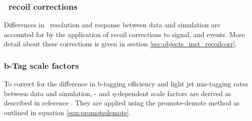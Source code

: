\subsubsection*{\MET~recoil corrections}
Differences in \MET~resolution and response between data and simulation
are accounted for by the application of recoil corrections
to signal, \Wjets and \Ztautau events. More detail
about these corrections is given in section \ref{sec:objects_met_recoilcorr}.
\subsubsection*{b-Tag scale factors}
To correct for the difference in b-tagging efficiency
and light jet mis-tagging rates between data and simulation,
\pT- and $\eta$-dependent scale factors are derived as 
described in reference \cite{cms-btag-run2}. They 
are applied using the promote-demote method
as outlined in equation \ref{eqn:promotedemote}.
